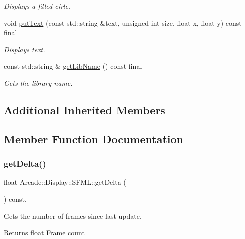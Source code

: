 \begin{DoxyCompactItemize}
\begin{DoxyCompactList}\small\item\em Displays a filled cirle. \end{DoxyCompactList}\item 
void \mbox{\hyperlink{classArcade_1_1Display_1_1SFML_a88bb03b669afd0df748fd66bf24d45f3}{put\+Text}} (const std\+::string \&text, unsigned int size, float x, float y) const final
\begin{DoxyCompactList}\small\item\em Displays text. \end{DoxyCompactList}\item 
const std\+::string \& \mbox{\hyperlink{classArcade_1_1Display_1_1SFML_a8c323cea968403cb2edf791d37dc7887}{get\+Lib\+Name}} () const final
\begin{DoxyCompactList}\small\item\em Gets the library name. \end{DoxyCompactList}\end{DoxyCompactItemize}
\subsection*{Additional Inherited Members}


\subsection{Member Function Documentation}
\mbox{\label{classArcade_1_1Display_1_1SFML_ae1466db8c13b08e99ebe5ffab68884c7}} 
\subsubsection{\texorpdfstring{getDelta()}{getDelta()}}
{\footnotesize\ttfamily float Arcade\+::\+Display\+::\+S\+F\+M\+L\+::get\+Delta (\begin{DoxyParamCaption}{ }\end{DoxyParamCaption}) const\hspace{0.3cm}{\ttfamily [final]}, {\ttfamily [virtual]}}



Gets the number of frames since last update. 

\begin{DoxyReturn}{Returns}
float Frame count 
\end{DoxyReturn}


